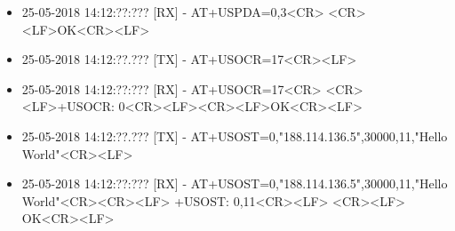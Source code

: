 \begin{itemize}
	\item 25-05-2018 14:12:??:??? [RX] - AT+USPDA=0,3<CR> \newline <CR><LF>\newline OK<CR><LF>
	\item 25-05-2018 14:12:??.??? [TX] - AT+USOCR=17<CR><LF>
	\item 25-05-2018 14:12:??:??? [RX] - AT+USOCR=17<CR> \newline <CR><LF>\newline +USOCR: 0<CR><LF>\newline <CR><LF>\newline OK<CR><LF>
	\item 25-05-2018 14:12:??.??? [TX] - AT+USOST=0,"188.114.136.5",30000,11,"Hello World"<CR><LF>
	\item 25-05-2018 14:12:??:??? [RX] - AT+USOST=0,"188.114.136.5",30000,11,"Hello World"<CR>\newline <CR><LF> \newline +USOST: 0,11<CR><LF> \newline <CR><LF> \newline OK<CR><LF>
\end{itemize}
